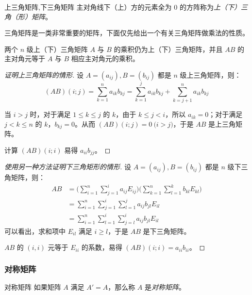 \begin{definition}{上三角矩阵,下三角矩阵}
	主对角线下（上）方的元素全为 $0$ 的方阵称为\emph{上（下）三角（形）矩阵}。
\end{definition}

三角矩阵是一类非常重要的矩阵，下面仅先给出一个有关三角矩阵做乘法的性质。

\begin{theorem}
	两个 $n$ 级上（下）三角矩阵 $A$ 与 $B$ 的乘积仍为上（下）三角矩阵，并且 $AB$ 的主对角元等于 $A$ 与 $B$ 相应主对角元的乘积。
\end{theorem}

\begin{proof}[证明上三角矩阵的情形]
	设 $A = (a_{ij}), B = (b_{ij})$ 都是 $n$ 级上三角矩阵，则：
	$$
	(AB)(i; j) = \sum\limits_{k = 1}^n a_{ik} b_{kj} = \sum\limits_{k = 1}^j a_{ik}b_{kj} + \sum\limits_{k = j + 1}^n a_{ik} b_{kj}
	$$

	当 $i > j$ 时，对于满足 $1 \le k \le j$ 的 $k$，由于 $k \le j < i$，所以 $a_{ik} = 0$；对于满足 $j < k \le n$ 的 $k$，$b_{kj} = 0$。从而 $(AB)(i; j) = 0 \pod{i > j}$，于是 $AB$ 是上三角矩阵。

	计算 $(AB)(i; i)$ 易得 $a_{ii} b_{jj}$。
\end{proof}

\begin{proof}[使用另一种方法证明下三角矩形的情形]
	设 $A = (a_{ij}), B = (b_{ij})$ 都是 $n$ 级下三角矩阵，则：
	$$
	\begin{aligned}
		AB &= \biggl( \sum_{i = 1}^n \sum_{j = 1}^i a_{ij} E_{ij} \biggr) \biggl( \sum_{k = 1}^n \sum_{l = 1}^k b_{kl} E_{kl} \biggr)
		\\&=
		\sum_{i = 1}^n \sum_{j = 1}^i \sum_{l = 1}^j a_{ij} b_{jl} E_{il}
		\\&=
		\sum_{i = 1}^n \sum_{l = 1}^i \sum_{j = l}^i a_{ij} b_{jl} E_{il}
	\end{aligned}
	$$
	可以看出，求和项中 $E_{il}$ 满足 $i \ge l$，于是 $AB$ 是下三角矩阵。

	$AB$ 的 $(i, i)$ 元等于 $E_{ii}$ 的系数，易得 $(AB)(i; i) = a_{ii} b_{ii}$。
\end{proof}

\subsubsection{对称矩阵}

\begin{definition}{对称矩阵}
	如果矩阵 $A$ 满足 $A' = A$，那么称 $A$ 是\emph{对称矩阵}。
\end{definition}

